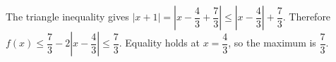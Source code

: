 The triangle inequality gives $|x+1|=|x-\dfrac{4}{3}+\dfrac{7}{3}|\le|x-\dfrac{4}{3}|+\dfrac{7}{3}$. Therefore $f(x)\le\dfrac{7}{3}-2|x-\dfrac{4}{3}|\le\dfrac{7}{3}$. Equality holds at $x=\dfrac{4}{3}$, so the maximum is $\boxed{\dfrac{7}{3}}$.
